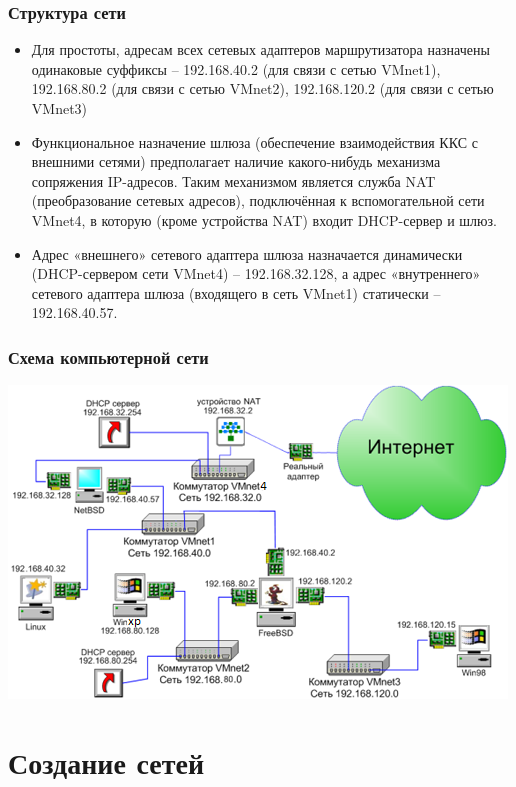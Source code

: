 \documentclass[9pt, compress]{beamer}
\begin{document}
\begin{frame}
\frametitle{Структура сети}
\begin{itemize}
\item  Для простоты, адресам всех сетевых адаптеров маршрутизатора назначены одинаковые суффиксы – 192.168.40.2 (для связи с сетью VMnet1), 192.168.80.2 (для связи с сетью VMnet2), 192.168.120.2 (для связи с сетью VMnet3)
\item Функциональное назначение шлюза (обеспечение взаимодействия ККС с внешними сетями) предполагает наличие какого-нибудь механизма сопряжения IP-адресов. Таким механизмом является служба NAT (преобразование сетевых адресов), подключённая к вспомогательной сети VMnet4, в которую (кроме устройства NAT) входит DHCP-сервер и шлюз.
\item Адрес «внешнего» сетевого адаптера шлюза назначается динамически (DHCP-сервером сети VMnet4) – 192.168.32.128, а адрес «внутреннего» сетевого адаптера шлюза (входящего в сеть VMnet1) статически – 192.168.40.57.
\end{itemize}

\end{frame}

\begin{frame}
\frametitle{Схема компьютерной сети}
\begin{center}  
	\includegraphics[width=\textwidth]{img/KKS_full}
\end{center}
\end{frame}

\section{Создание сетей}
\end{document}
